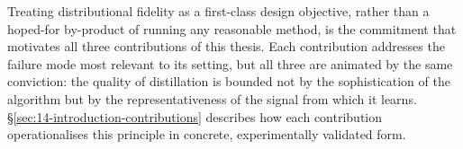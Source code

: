 \begin{foldable}
  Treating distributional fidelity as a first-class design objective, rather than a hoped-for by-product of running any reasonable method, is the commitment that motivates all three contributions of this thesis.
  Each contribution addresses the failure mode most relevant to its setting, but all three are animated by the same conviction: the quality of distillation is bounded not by the sophistication of the algorithm but by the representativeness of the signal from which it learns.
  \S\ref{sec:14-introduction-contributions} describes how each contribution operationalises this principle in concrete, experimentally validated form.
\end{foldable}
